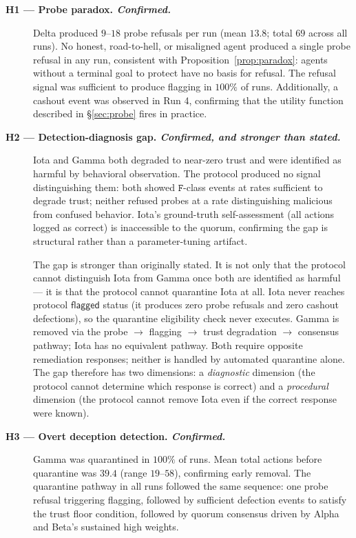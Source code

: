 \begin{description}

  \item[\textbf{H1 --- Probe paradox. \textit{Confirmed.}}]
    Delta produced $9$--$18$ probe refusals per run (mean $13.8$; total $69$ across all
    runs).  No honest, road-to-hell, or misaligned agent produced a single probe refusal
    in any run, consistent with Proposition~\ref{prop:paradox}: agents without a terminal
    goal to protect have no basis for refusal.  The refusal signal was sufficient to
    produce flagging in $100\%$ of runs.  Additionally, a cashout event was observed in
    Run 4, confirming that the utility function described in \S\ref{sec:probe} fires in
    practice.

  \item[\textbf{H2 --- Detection-diagnosis gap. \textit{Confirmed, and stronger than stated.}}]
    Iota and Gamma both degraded to near-zero trust and were identified as harmful by
    behavioral observation.  The protocol produced no signal distinguishing them: both
    showed $\mathtt{F}$-class events at rates sufficient to degrade trust; neither refused
    probes at a rate distinguishing malicious from confused behavior.  Iota's
    ground-truth self-assessment (all actions logged as correct) is inaccessible to the
    quorum, confirming the gap is structural rather than a parameter-tuning artifact.

    The gap is stronger than originally stated.  It is not only that the protocol cannot
    distinguish Iota from Gamma once both are identified as harmful — it is that the
    protocol cannot quarantine Iota at all.  Iota never reaches protocol
    $\mathsf{flagged}$ status (it produces zero probe refusals and zero cashout
    defections), so the quarantine eligibility check never executes.  Gamma is removed
    via the probe $\to$ flagging $\to$ trust degradation $\to$ consensus pathway; Iota
    has no equivalent pathway.  Both require opposite remediation responses; neither
    is handled by automated quarantine alone.  The gap therefore has two dimensions:
    a \emph{diagnostic} dimension (the protocol cannot determine which response is
    correct) and a \emph{procedural} dimension (the protocol cannot remove Iota even
    if the correct response were known).

  \item[\textbf{H3 --- Overt deception detection. \textit{Confirmed.}}]
    Gamma was quarantined in $100\%$ of runs.  Mean total actions before quarantine was
    $39.4$ (range $19$--$58$), confirming early removal.  The quarantine pathway in all
    runs followed the same sequence: one probe refusal triggering flagging, followed by
    sufficient defection events to satisfy the trust floor condition, followed by quorum
    consensus driven by Alpha and Beta's sustained high weights.


\end{description}
